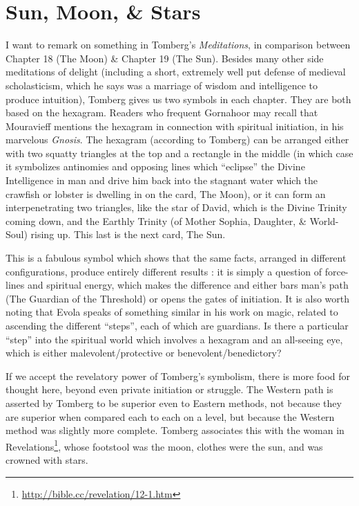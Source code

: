 \section{Sun, Moon, \& Stars}

I want to remark on something in Tomberg's \emph{Meditations}, in comparison between Chapter 18 (The Moon) \& Chapter 19 (The Sun). Besides many other side meditations of delight (including a short, extremely well put defense of medieval scholasticism, which he says was a marriage of wisdom and intelligence to produce intuition), Tomberg gives us two symbols in each chapter. They are both based on the hexagram. Readers who frequent Gornahoor may recall that Mouravieff mentions the hexagram in connection with spiritual initiation, in his marvelous \emph{Gnosis}. The hexagram (according to Tomberg) can be arranged either with two squatty triangles at the top and a rectangle in the middle (in which case it symbolizes antinomies and opposing lines which ``eclipse'' the Divine Intelligence in man and drive him back into the stagnant water which the crawfish or lobster is dwelling in on the card, The Moon), or it can form an interpenetrating two triangles, like the star of David, which is the Divine Trinity coming down, and the Earthly Trinity (of Mother Sophia, Daughter, \& World-Soul) rising up. This last is the next card, The Sun.

This is a fabulous symbol which shows that the same facts, arranged in different configurations, produce entirely different results : it is simply a question of force-lines and spiritual energy, which makes the difference and either bars man's path (The Guardian of the Threshold) or opens the gates of initiation. It is also worth noting that Evola speaks of something similar in his work on magic, related to ascending the different ``steps'', each of which are guardians. Is there a particular ``step'' into the spiritual world which involves a hexagram and an all-seeing eye, which is either malevolent/protective or benevolent/benedictory?

If we accept the revelatory power of Tomberg's symbolism, there is more food for thought here, beyond even private initiation or struggle. The Western path is asserted by Tomberg to be superior even to Eastern methods, not because they are superior when compared each to each on a level, but because the Western method was slightly more complete. Tomberg associates this with the woman in Revelations\footnote{\url{http://bible.cc/revelation/12-1.htm}}, whose footstool was the moon, clothes were the sun, and was crowned with stars.

